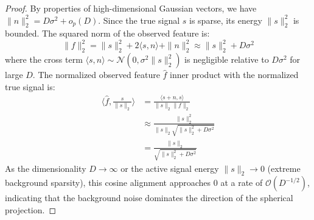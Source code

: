 \documentclass{article}
\theoremstyle{plain}
\theoremstyle{definition}
\theoremstyle{remark}
\begin{document}
\begin{proof}
By properties of high-dimensional Gaussian vectors, we have $\|n\|_2^2 = D\sigma^2 + o_p(D)$. Since the true signal $s$ is sparse, its energy $\|s\|_2^2$ is bounded. The squared norm of the observed feature is:
\begin{equation}
    \|f\|_2^2 = \|s\|_2^2 + 2\langle s, n \rangle + \|n\|_2^2 \approx \|s\|_2^2 + D \sigma^2
\end{equation}
where the cross term $\langle s, n \rangle \sim \mathcal{N}(0, \sigma^2 \|s\|_2^2)$ is negligible relative to $D\sigma^2$ for large $D$. The normalized observed feature $\hat{f}$ inner product with the normalized true signal is:
\begin{equation}
    \begin{split}
        \langle \hat{f}, \frac{s}{\|s\|_2} \rangle &= \frac{\langle s + n, s \rangle}{\|s\|_2 \|f\|_2} \\
        &\approx \frac{\|s\|_2^2}{\|s\|_2 \sqrt{\|s\|_2^2 + D \sigma^2}} \\
        &= \frac{\|s\|_2}{\sqrt{\|s\|_2^2 + D \sigma^2}}
    \end{split}
\end{equation}
As the dimensionality $D \to \infty$ or the active signal energy $\|s\|_2 \to 0$ (extreme background sparsity), this cosine alignment approaches $0$ at a rate of $\mathcal{O}(D^{-1/2})$, indicating that the background noise dominates the direction of the spherical projection.


\end{proof}
\end{document}
